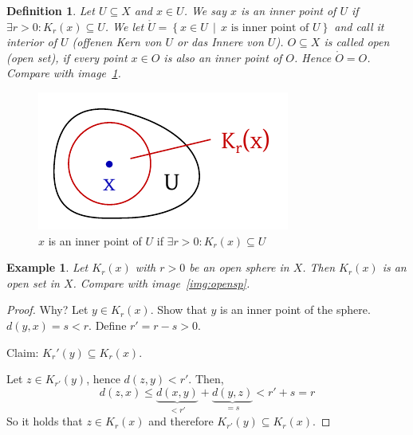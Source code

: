 \documentclass{article}
\newtheorem{example}{Example}  \numberwithin{example}{section}
\newtheorem{definition}{Definition}  \numberwithin{definition}{section}
\newcommand{\setdef}[2]{\left\{\left.#1\,\middle|\,#2\right.\right\}}
\begin{document}
\begin{definition} %
  Let $U \subseteq X$ and $x \in U$.
  We say $x$ is an \emph{inner point of $U$} if $\exists r > 0: K_r(x) \subseteq U$.
  We let $\mathring{U} = \setdef{x \in U}{x \text{ is inner point of } U}$ and call it \emph{interior of $U$} (\foreignlanguage{german}{offenen Kern von $U$} or \foreignlanguage{german}{das Innere von $U$}).
  $O \subseteq X$ is called \emph{open} (open set), if every point $x \in O$ is also an inner point of $O$.
  Hence $\mathring{O} = O$. Compare with image~\ref{img:inner}.
\end{definition}

\begin{figure}[t]
  \begin{center}
    \includegraphics{img/04_inner_point.pdf}
    \caption{$x$ is an inner point of $U$ if $\exists r > 0: K_r(x) \subseteq U$}
    \label{img:inner}
  \end{center}
\end{figure}

\begin{example}
  Let $K_r(x)$ with $r > 0$ be an open sphere in $X$.
  Then $K_r(x)$ is an open set in $X$.
  Compare with image~\ref{img:opensp}.
\end{example}

\begin{proof}
  Why? Let $y \in K_r(x)$. Show that $y$ is an inner point of the sphere.
  $d(y,x) = s < r$. Define $r' = r - s > 0$.

  Claim: $K_r'(y) \subseteq K_r(x)$.

  Let $z \in K_{r'}(y)$, hence $d(z, y) < r'$. Then,
  \[ d(z, x) \leq \underbrace{d(x, y)}_{< r'} + \underbrace{d(y, z)}_{= s} < r' + s = r \]
  So it holds that $z \in K_r(x)$ and therefore $K_{r'}(y) \subseteq K_r(x)$.
\end{proof}
\end{document}
